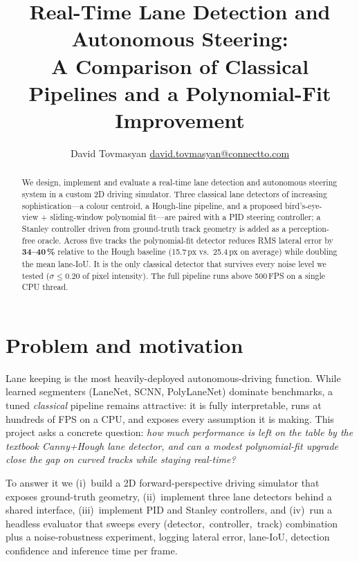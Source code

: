 \documentclass[10pt,a4paper,twocolumn]{article}
\title{\vspace{-1.5em}\textbf{Real-Time Lane Detection and Autonomous Steering:\\
A Comparison of Classical Pipelines and a Polynomial-Fit Improvement}}
\author{David Tovmasyan \quad\textbullet\quad \href{mailto:david.tovmasyan@connectto.com}{david.tovmasyan@connectto.com}}
\date{}
\begin{document}
\twocolumn[
  \begin{@twocolumnfalse}
    \maketitle
    \vspace{-2.5em}
  \end{@twocolumnfalse}
]

\begin{abstract}\small
\noindent
We design, implement and evaluate a real-time lane detection and
autonomous steering system in a custom 2D driving simulator. Three
classical lane detectors of increasing sophistication---a colour
centroid, a Hough-line pipeline, and a proposed bird's-eye-view +
sliding-window polynomial fit---are paired with a PID steering
controller; a Stanley controller driven from ground-truth track
geometry is added as a perception-free oracle. Across five tracks the
polynomial-fit detector reduces RMS lateral error by
\textbf{34--40\,\%} relative to the Hough baseline (15.7\,px vs.\
25.4\,px on average) while doubling the mean lane-IoU. It is the only
classical detector that survives every noise level we tested
($\sigma\!\le\!0.20$ of pixel intensity). The full pipeline runs above
500\,FPS on a single CPU thread.
\end{abstract}

\section{Problem and motivation}

Lane keeping is the most heavily-deployed autonomous-driving function.
While learned segmenters (LaneNet, SCNN, PolyLaneNet) dominate
benchmarks, a tuned \emph{classical} pipeline remains attractive: it is
fully interpretable, runs at hundreds of FPS on a CPU, and exposes
every assumption it is making. This project asks a concrete question:
\emph{how much performance is left on the table by the textbook
Canny+Hough lane detector, and can a modest polynomial-fit upgrade
close the gap on curved tracks while staying real-time?}

To answer it we (i)~build a 2D forward-perspective driving simulator
that exposes ground-truth geometry, (ii)~implement three lane detectors
behind a shared interface, (iii)~implement PID and Stanley controllers,
and (iv)~run a headless evaluator that sweeps every
(detector,~controller,~track) combination plus a noise-robustness
experiment, logging lateral error, lane-IoU, detection confidence and
inference time per frame.
\end{document}
